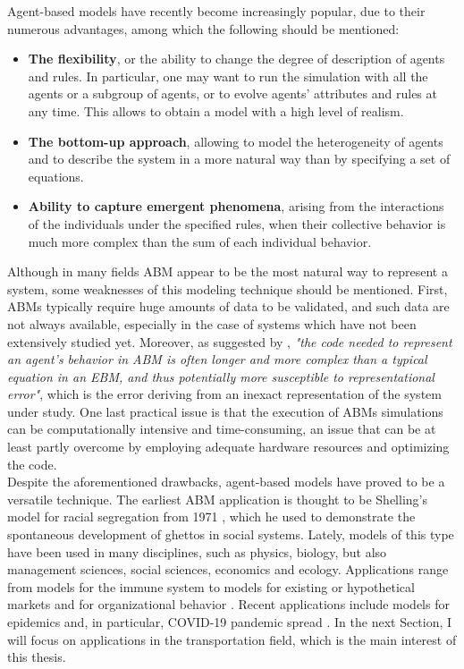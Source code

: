 Agent-based models have recently become increasingly popular, due to their numerous advantages, among which the following should be mentioned:
\begin{itemize}
    \item \textbf{The flexibility}, or the ability to change the degree of description of agents and rules. In particular, one may want to run the simulation with all the agents or a subgroup of agents, or to evolve agents' attributes and rules at any time. This allows to obtain a model with a high level of realism. 
    \item \textbf{The bottom-up approach}, allowing to model the heterogeneity of agents and to describe the system in a more natural way than by specifying a set of equations.
    \item \textbf{Ability to capture emergent phenomena}, arising from the interactions of the individuals under the specified rules, when their collective behavior is much more complex than the sum of each individual behavior. 
\end{itemize}
Although in many fields ABM appear to be the most natural way to represent a system, some weaknesses of this modeling technique should be mentioned. First, ABMs typically require huge amounts of data to be validated, and such data are not always available, especially in the case of systems which have not been extensively studied yet. Moreover, as suggested by \textcite{parunak}, \textit{"the code needed to represent an agent’s behavior in ABM is often longer and more complex than a typical equation in an EBM, and thus potentially more susceptible to representational error"}, which is the error deriving from an inexact representation of the system under study. One last practical issue is that the execution of ABMs simulations can be computationally intensive and time-consuming, an issue that can be at least partly overcome by employing adequate hardware resources and optimizing the code. \\

Despite the aforementioned drawbacks, agent-based models have proved to be a versatile technique. The earliest ABM application is thought to be Shelling's model for racial segregation from 1971 \cite{shelling71}, which he used to demonstrate the spontaneous development of ghettos in social systems. Lately, models of this type have been used in many disciplines, such as physics, biology, but also management sciences, social sciences, economics and ecology. Applications range from models for the immune system \cite{Folcik2007TheBI} to models for existing or hypothetical markets \cite{Charania2006SubOrbitalST, markets2, market3} and for organizational behavior \cite{organization}. Recent applications include models for epidemics and, in particular, COVID-19 pandemic spread \cite{covid1, covid2, covid3}. In the next Section, I will focus on applications in the transportation field, which is the main interest of this thesis.


